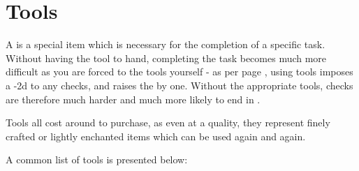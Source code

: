 \chapter{Tools}\label{S:Tools}

\newcommand\tool[4]
{
	
	\begin{rndtable}{r p{7cm}}
		\multicolumn{2}{c}{\large \key{#1}}
		\\
		\key{Attribute} & {#2}
		\\
		\key{Components} & {#3}
		\\
		\key{Purpose} & {#4}
	\end{rndtable}
	\vspace{0.5 cm}
}


A  is a special item which is necessary for the completion of a specific task. Without having the tool to hand, completing the task becomes much more difficult as you are forced to  the tools yourself - as per page \pageref{S:Quality}, using  tools imposes a -2d to any checks, and raises the  by one. Without the appropriate tools, checks are therefore much harder and much more likely to end in .

Tools all cost around  to purchase, as even at a  quality, they represent finely crafted or lightly enchanted items which can be used again and again. 

A common list of tools is presented below:



